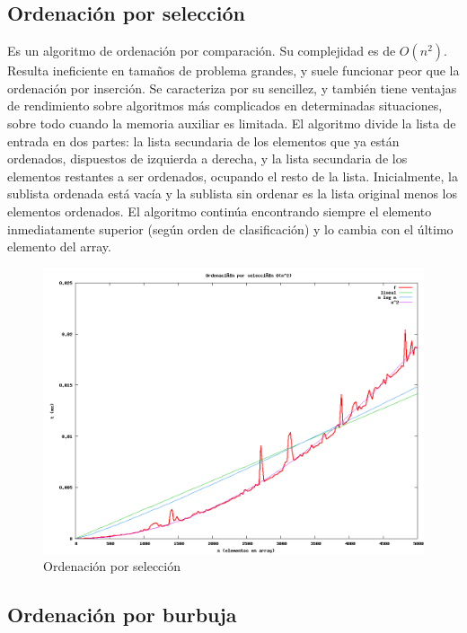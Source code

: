 \subsection{Ordenación por selecci\'on}
Es un algoritmo de ordenación por comparación. Su complejidad es de $O(n^2)$. Resulta ineficiente en tamaños de problema grandes, y suele funcionar peor que la ordenación por inserción. Se caracteriza por su sencillez, y también tiene ventajas de rendimiento sobre algoritmos más complicados en determinadas situaciones, sobre todo cuando la memoria auxiliar es limitada.
El algoritmo divide la lista de entrada en dos partes: la lista secundaria de los elementos que ya están ordenados, dispuestos de izquierda a derecha, y la lista secundaria de los elementos restantes a ser ordenados, ocupando el resto de la lista. Inicialmente, la sublista ordenada está vacía y la sublista sin ordenar es la lista original menos los elementos ordenados. El algoritmo continúa encontrando siempre el elemento inmediatamente superior (según orden de clasificación) y lo cambia con el último elemento del array.

	\begin{figure}[H]
	  \centering
	    \includegraphics[width=1.0\textwidth]{selection-sort.png}
	  \caption{Ordenación por selección}
	  \label{fig:selection}
	\end{figure}

\subsection{Ordenación por burbuja}

